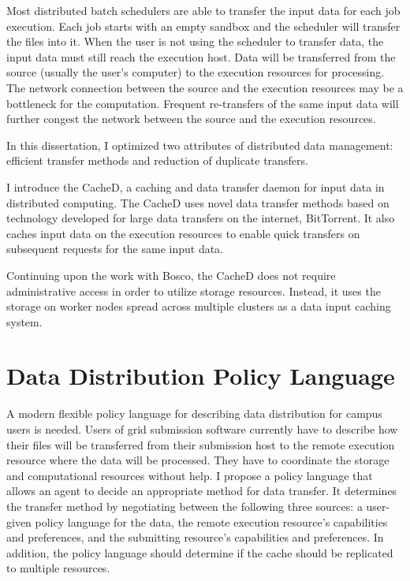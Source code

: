 Most distributed batch schedulers are able to transfer the input data for each job execution.  Each job starts with an empty sandbox and the scheduler will transfer the files into it.  When the user is not using the scheduler to transfer data, the input data must still reach the execution host.  Data will be transferred from the source (usually the user's computer) to the execution resources for processing.  The network connection between the source and the execution resources may be a bottleneck for the computation.  Frequent re-transfers of the same input data will further congest the network between the source and the execution resources.

In this dissertation, I optimized two attributes of distributed data management: efficient transfer methods and reduction of duplicate transfers.

I introduce the CacheD, a caching and data transfer daemon for input data in distributed computing.  The CacheD uses novel data transfer methods based on technology developed for large data transfers on the internet, BitTorrent.  It also caches input data on the execution resources to enable quick transfers on subsequent requests for the same input data.

Continuing upon the work with Bosco, the CacheD does not require administrative access in order to utilize storage resources.  Instead, it uses the storage on worker nodes spread across multiple clusters as a data input caching system.

\section{Data Distribution Policy Language}

A modern flexible policy language for describing data distribution for campus users is needed.  Users of grid submission software currently have to describe how their files will be transferred from their submission host to the remote execution resource where the data will be processed.  They have to coordinate the storage and computational resources without help.  I propose a policy language that allows an agent to decide an appropriate method for data transfer.  It determines the transfer method by negotiating between the following three sources: a user-given policy language for the data, the remote execution resource's capabilities and preferences, and the submitting resource's capabilities and preferences.  In addition, the policy language should determine if the cache should be replicated to multiple resources.


